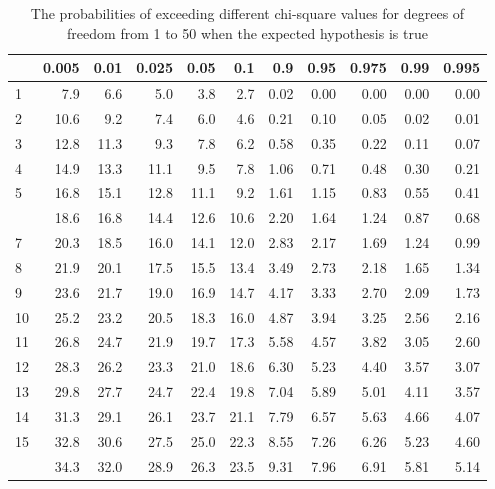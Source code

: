\documentclass[11pt,ignorenonframetext,aspectratio=169]{beamer}
\begin{document}
\begin{frame}{}
\protect\hypertarget{section-5}{}
\begin{table}

\caption{\label{tab:chi-sqrt-values}The probabilities of exceeding different chi-square values for degrees of freedom from 1 to 50 when the expected hypothesis is true}
\centering
\fontsize{5}{7}\selectfont
\begin{tabular}[t]{lrrrr|>{}rrrrrr}
\toprule
  & 0.005 & 0.01 & 0.025 & 0.05 & 0.1 & 0.9 & 0.95 & 0.975 & 0.99 & 0.995\\
\midrule
\rowcolor{gray!6}  1 & 7.9 & 6.6 & 5.0 & 3.8 & 2.7 & 0.02 & 0.00 & 0.00 & 0.00 & 0.00\\
2 & 10.6 & 9.2 & 7.4 & 6.0 & 4.6 & 0.21 & 0.10 & 0.05 & 0.02 & 0.01\\
\rowcolor{gray!6}  3 & 12.8 & 11.3 & 9.3 & 7.8 & 6.2 & 0.58 & 0.35 & 0.22 & 0.11 & 0.07\\
4 & 14.9 & 13.3 & 11.1 & 9.5 & 7.8 & 1.06 & 0.71 & 0.48 & 0.30 & 0.21\\
\rowcolor{gray!6}  5 & 16.8 & 15.1 & 12.8 & 11.1 & 9.2 & 1.61 & 1.15 & 0.83 & 0.55 & 0.41\\
\addlinespace
6 & 18.6 & 16.8 & 14.4 & 12.6 & 10.6 & 2.20 & 1.64 & 1.24 & 0.87 & 0.68\\
\rowcolor{gray!6}  7 & 20.3 & 18.5 & 16.0 & 14.1 & 12.0 & 2.83 & 2.17 & 1.69 & 1.24 & 0.99\\
8 & 21.9 & 20.1 & 17.5 & 15.5 & 13.4 & 3.49 & 2.73 & 2.18 & 1.65 & 1.34\\
\rowcolor{gray!6}  9 & 23.6 & 21.7 & 19.0 & 16.9 & 14.7 & 4.17 & 3.33 & 2.70 & 2.09 & 1.73\\
10 & 25.2 & 23.2 & 20.5 & 18.3 & 16.0 & 4.87 & 3.94 & 3.25 & 2.56 & 2.16\\
\addlinespace
\rowcolor{gray!6}  11 & 26.8 & 24.7 & 21.9 & 19.7 & 17.3 & 5.58 & 4.57 & 3.82 & 3.05 & 2.60\\
12 & 28.3 & 26.2 & 23.3 & 21.0 & 18.6 & 6.30 & 5.23 & 4.40 & 3.57 & 3.07\\
\rowcolor{gray!6}  13 & 29.8 & 27.7 & 24.7 & 22.4 & 19.8 & 7.04 & 5.89 & 5.01 & 4.11 & 3.57\\
14 & 31.3 & 29.1 & 26.1 & 23.7 & 21.1 & 7.79 & 6.57 & 5.63 & 4.66 & 4.07\\
\rowcolor{gray!6}  15 & 32.8 & 30.6 & 27.5 & 25.0 & 22.3 & 8.55 & 7.26 & 6.26 & 5.23 & 4.60\\
\addlinespace
16 & 34.3 & 32.0 & 28.9 & 26.3 & 23.5 & 9.31 & 7.96 & 6.91 & 5.81 & 5.14\\

\end{tabular}
\end{table}
\end{frame}
\end{document}
